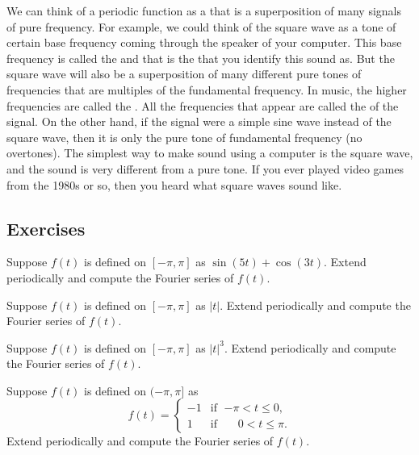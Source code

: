 \medskip

We can think of a periodic function as a 
that is a superposition of
many signals of pure frequency.
For example, we could think of the square
wave as a tone of certain base frequency
coming through the speaker of your computer.
This base frequency is called the
\emph{}
and that is the  that you identify this sound as.
But the square wave will also be
a superposition of
many different pure tones of frequencies that are multiples of the
fundamental frequency.
In music,
the higher frequencies are called the \emph{}.
All the frequencies that appear are called the
\emph{} of the signal.
On the other hand,
if the signal were
a simple sine wave instead of the square wave,
then it is only the pure tone of
fundamental frequency (no overtones).
The simplest way to make sound using a computer is the square wave,
and the sound is very different from a pure tone.
If you ever played video games
from the 1980s or so, then you heard what square waves sound like.

\subsection{Exercises}

\begin{exercise}
Suppose $f(t)$ is defined on $[-\pi,\pi]$ as $\sin (5t) + \cos (3t)$.  Extend
periodically and compute the Fourier series of $f(t)$.
\end{exercise}

\begin{exercise}
Suppose $f(t)$ is defined on $[-\pi,\pi]$ as $\lvert t \rvert$.
Extend periodically and compute the Fourier series of $f(t)$.
\end{exercise}

\begin{exercise}
Suppose $f(t)$ is defined on $[-\pi,\pi]$ as $\lvert t \rvert^3$.
Extend periodically and compute the Fourier series of $f(t)$.
\end{exercise}

\begin{exercise}
Suppose $f(t)$ is defined on $(-\pi,\pi]$ as
\begin{equation*}
f(t) =
\begin{cases}
-1 & \text{if } \; {-\pi} < t \leq 0 , \\
1 & \text{if } \; \phantom{-}0 < t \leq \pi .
\end{cases}
\end{equation*}
Extend periodically and compute the Fourier series of $f(t)$.
\end{exercise}

